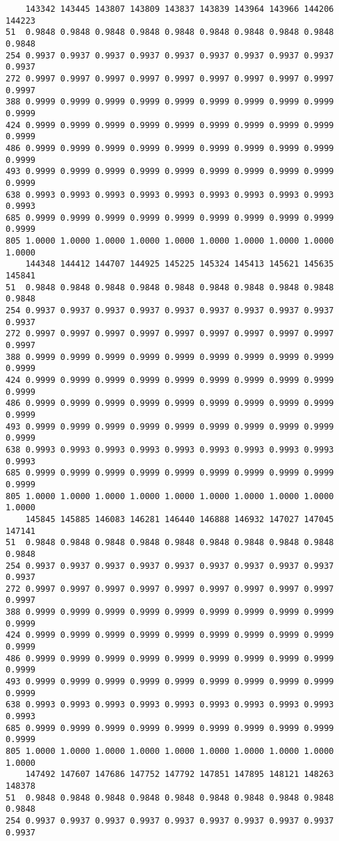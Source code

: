 \documentclass[
]{report}
\begin{document}
\begin{verbatim}
    143342 143445 143807 143809 143837 143839 143964 143966 144206 144223
51  0.9848 0.9848 0.9848 0.9848 0.9848 0.9848 0.9848 0.9848 0.9848 0.9848
254 0.9937 0.9937 0.9937 0.9937 0.9937 0.9937 0.9937 0.9937 0.9937 0.9937
272 0.9997 0.9997 0.9997 0.9997 0.9997 0.9997 0.9997 0.9997 0.9997 0.9997
388 0.9999 0.9999 0.9999 0.9999 0.9999 0.9999 0.9999 0.9999 0.9999 0.9999
424 0.9999 0.9999 0.9999 0.9999 0.9999 0.9999 0.9999 0.9999 0.9999 0.9999
486 0.9999 0.9999 0.9999 0.9999 0.9999 0.9999 0.9999 0.9999 0.9999 0.9999
493 0.9999 0.9999 0.9999 0.9999 0.9999 0.9999 0.9999 0.9999 0.9999 0.9999
638 0.9993 0.9993 0.9993 0.9993 0.9993 0.9993 0.9993 0.9993 0.9993 0.9993
685 0.9999 0.9999 0.9999 0.9999 0.9999 0.9999 0.9999 0.9999 0.9999 0.9999
805 1.0000 1.0000 1.0000 1.0000 1.0000 1.0000 1.0000 1.0000 1.0000 1.0000
    144348 144412 144707 144925 145225 145324 145413 145621 145635 145841
51  0.9848 0.9848 0.9848 0.9848 0.9848 0.9848 0.9848 0.9848 0.9848 0.9848
254 0.9937 0.9937 0.9937 0.9937 0.9937 0.9937 0.9937 0.9937 0.9937 0.9937
272 0.9997 0.9997 0.9997 0.9997 0.9997 0.9997 0.9997 0.9997 0.9997 0.9997
388 0.9999 0.9999 0.9999 0.9999 0.9999 0.9999 0.9999 0.9999 0.9999 0.9999
424 0.9999 0.9999 0.9999 0.9999 0.9999 0.9999 0.9999 0.9999 0.9999 0.9999
486 0.9999 0.9999 0.9999 0.9999 0.9999 0.9999 0.9999 0.9999 0.9999 0.9999
493 0.9999 0.9999 0.9999 0.9999 0.9999 0.9999 0.9999 0.9999 0.9999 0.9999
638 0.9993 0.9993 0.9993 0.9993 0.9993 0.9993 0.9993 0.9993 0.9993 0.9993
685 0.9999 0.9999 0.9999 0.9999 0.9999 0.9999 0.9999 0.9999 0.9999 0.9999
805 1.0000 1.0000 1.0000 1.0000 1.0000 1.0000 1.0000 1.0000 1.0000 1.0000
    145845 145885 146083 146281 146440 146888 146932 147027 147045 147141
51  0.9848 0.9848 0.9848 0.9848 0.9848 0.9848 0.9848 0.9848 0.9848 0.9848
254 0.9937 0.9937 0.9937 0.9937 0.9937 0.9937 0.9937 0.9937 0.9937 0.9937
272 0.9997 0.9997 0.9997 0.9997 0.9997 0.9997 0.9997 0.9997 0.9997 0.9997
388 0.9999 0.9999 0.9999 0.9999 0.9999 0.9999 0.9999 0.9999 0.9999 0.9999
424 0.9999 0.9999 0.9999 0.9999 0.9999 0.9999 0.9999 0.9999 0.9999 0.9999
486 0.9999 0.9999 0.9999 0.9999 0.9999 0.9999 0.9999 0.9999 0.9999 0.9999
493 0.9999 0.9999 0.9999 0.9999 0.9999 0.9999 0.9999 0.9999 0.9999 0.9999
638 0.9993 0.9993 0.9993 0.9993 0.9993 0.9993 0.9993 0.9993 0.9993 0.9993
685 0.9999 0.9999 0.9999 0.9999 0.9999 0.9999 0.9999 0.9999 0.9999 0.9999
805 1.0000 1.0000 1.0000 1.0000 1.0000 1.0000 1.0000 1.0000 1.0000 1.0000
    147492 147607 147686 147752 147792 147851 147895 148121 148263 148378
51  0.9848 0.9848 0.9848 0.9848 0.9848 0.9848 0.9848 0.9848 0.9848 0.9848
254 0.9937 0.9937 0.9937 0.9937 0.9937 0.9937 0.9937 0.9937 0.9937 0.9937

\end{verbatim}
\end{document}
